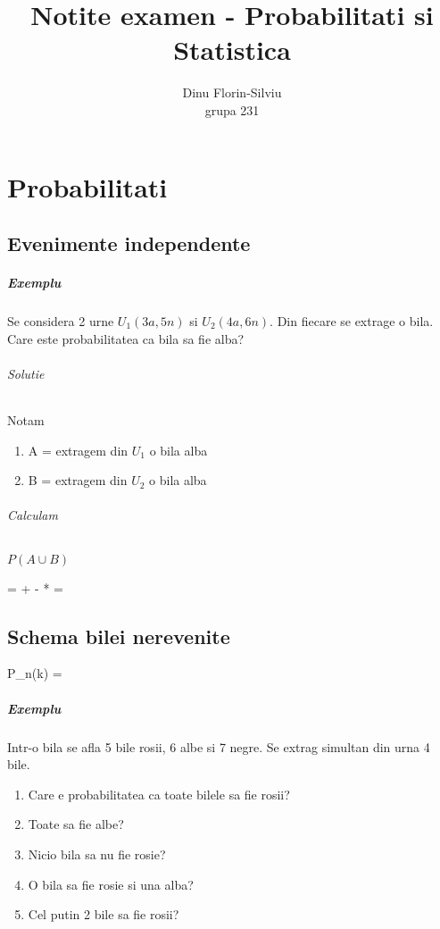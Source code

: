 \documentclass[oneside]{memoir}
\title{Notite examen - Probabilitati si Statistica}
\date{}
\author{Dinu Florin-Silviu \\ grupa 231}
\begin{document}
\maketitle
\tableofcontents

\newpage
{}

\chapter[Probabilitati]{Probabilitati}
\section[Evenimente independente]{Evenimente independente}
\paragraph*{Exemplu} Se considera 2 urne $U_1(3a, 5n)$ si $U_2(4a, 6n)$. Din fiecare se extrage o bila. Care este probabilitatea ca bila sa fie alba?
\subparagraph*{Solutie} Notam
\begin{enumerate}
    \item A = extragem din $U_1$ o bila alba
    \item B = extragem din $U_2$ o bila alba
\end{enumerate}
\subparagraph*{Calculam} $P(A\cup B)$
\begin{center}
    \begin{myequation*}
 =  +  - * = 
    \end{myequation*}
\end{center}

\section[Schema bilei nerevenite]{Schema bilei nerevenite}
\begin{center}
    \begin{myequation*}
        P_n(k) = 
    \end{myequation*}
\end{center}
\paragraph*{Exemplu} Intr-o bila se afla 5 bile rosii, 6 albe si 7 negre. Se extrag simultan din urna 4 bile.
\begin{enumerate}
    \item Care e probabilitatea ca toate bilele sa fie rosii?
    \item Toate sa fie albe?
    \item Nicio bila sa nu fie rosie?
    \item O bila sa fie rosie si una alba?
    \item Cel putin 2 bile sa fie rosii?
\end{enumerate}
\end{document}
